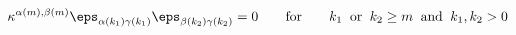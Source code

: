 \begin{equation}\label{eq:kappa_prop}
\kappa^{\alpha(m),\beta(m)}\eps_{\alpha(k_1)\gamma(k_1)}
\eps_{\beta(k_2)\gamma(k_2)}=
0 \qquad \mbox{for} \qquad k_1\;\;\mbox{or}\;\; k_2 \geq m\;\;\mbox{and}\;\;k_1,k_2> 0
\end{equation}

